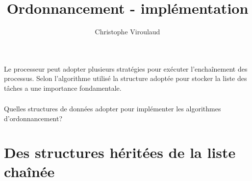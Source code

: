 \documentclass[svgnames,11pt]{beamer}
\author[]{Christophe Viroulaud}
\title{Ordonnancement - implémentation}
\date{\framebox{\textbf{Archi 05}}}
\institute{Terminale - NSI}
\begin{document}
\begin{frame}
    \titlepage
\end{frame}
\begin{frame}
    \frametitle{}

    Le processeur peut adopter plusieurs stratégies pour exécuter l'enchaînement des processus. Selon l'algorithme utilisé la structure adoptée pour stocker la liste des tâches a une importance fondamentale.
\end{frame}
\begin{frame}
    \frametitle{}

    \begin{framed}\centering
        Quelles structures de données adopter pour implémenter les algorithmes d'ordonnancement?
    \end{framed}
\end{frame}
\section{Des structures héritées de la liste chaînée}
\end{document}
